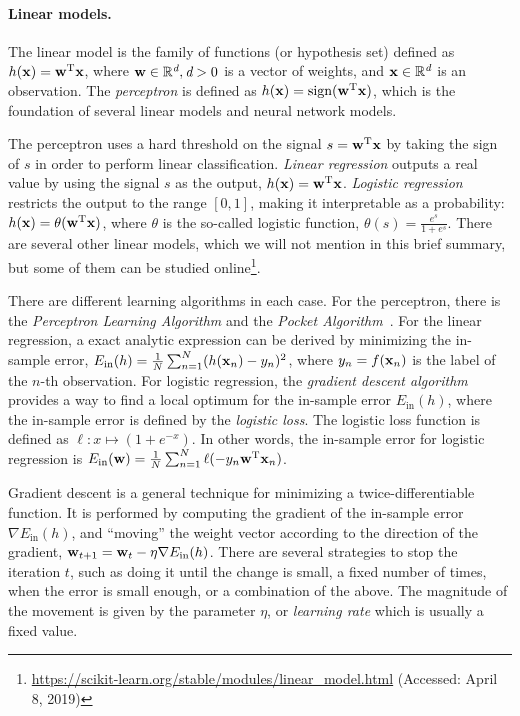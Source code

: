 \paragraph{Linear models.} The linear model is the family of functions (or
hypothesis set) defined as $h(\boldsymbol{\mathbf{x}}) = \boldsymbol{\mathbf{w}}^{\text{T}}\boldsymbol{\mathbf{x}}$, where
$\boldsymbol{\mathbf{w}} \in \mathbb{R}^\textit{d}, \textit{d} > 0$ is a vector of weights, and
$\boldsymbol{\mathbf{x}}\in \mathbb{R}^\textit{d}$ is an observation. 
%
The {\em perceptron} is defined as $h(\boldsymbol{\mathbf{x}}) =
\text{sign}(\boldsymbol{\mathbf{w}}^{\text{T}}\boldsymbol{\mathbf{x}})$, which is the foundation of several
linear models and neural network models.


The perceptron uses a hard threshold on the signal $s =
\boldsymbol{\mathbf{w}}^{\text{T}}\boldsymbol{\mathbf{x}}$ by taking the sign of $s$ in order to perform linear
classification.
%
{\em Linear regression} outputs a real value by using the signal $s$ as the
output, $h(\boldsymbol{\mathbf{x}}) = \boldsymbol{\mathbf{w}}^{\text{T}}\boldsymbol{\mathbf{x}}$.
%
{\em Logistic regression} restricts the output to the range $[0, 1]$, making
it interpretable as a probability: $h(\boldsymbol{\mathbf{x}}) =
\theta(\boldsymbol{\mathbf{w}}^{\text{T}}\boldsymbol{\mathbf{x}})$, where $\theta$ is the so-called logistic
function, $\theta(s) = \frac{e^s}{1 + e^s}$.
%
There are several other linear models, which we will not mention in this brief
summary, but some of them can be studied
online\footnote{\url{https://scikit-learn.org/stable/modules/linear_model.html}
(Accessed: April 8, 2019)}.


There are different learning algorithms in each case. 
%
For the perceptron, there is the {\em Perceptron Learning Algorithm} and the
{\em Pocket Algorithm}~\cite{Abu-Mostafa:2012:LD:2207825}. 
%
For the linear regression, a exact analytic expression can be derived by
minimizing the in-sample error, $E_{\text{in}}(h) = \frac{1}{N} \sum_{n=1}^{N}
(h(\boldsymbol{\mathbf{x}}_n) - y_n)^2$, where $y_n = f(\boldsymbol{\mathbf{x}}_n)$ is the label of the $n$-th
observation.
%
For logistic regression, the {\em gradient descent algorithm} provides a way to
find a local optimum for the in-sample error $E_{\text{in}}(h)$, where the
in-sample error is defined by the {\em logistic loss}.
%
The logistic loss function is defined as $\ell: x \mapsto (1 +
\mathit{e}^{-x})$.
% 
In other words, the in-sample error for logistic regression is
$E_{\text{in}}(\boldsymbol{\mathbf{w}}) = \frac{1}{N}\sum_{n=1}^N
\ell(-y_n\boldsymbol{\mathbf{w}}^\text{T}\boldsymbol{\mathbf{x}}_n)$.




Gradient descent is a general technique for minimizing a twice-differentiable
function. 
%
It is performed by computing the gradient of the in-sample error $\nabla
E_{\text{in}}(h)$, and ``moving'' the weight vector according to the direction
of the gradient, $\boldsymbol{\mathbf{w}}_{t+1} = \boldsymbol{\mathbf{w}}_t - \eta\nabla E_{\text{in}}(h)$.
%
There are several strategies to stop the iteration $t$, such as doing it until
the change is small, a fixed number of times, when the error is small enough, or
a combination of the above.
%
The magnitude of the movement is given by the parameter $\eta$, or {\em learning
rate} which is usually a fixed value.

